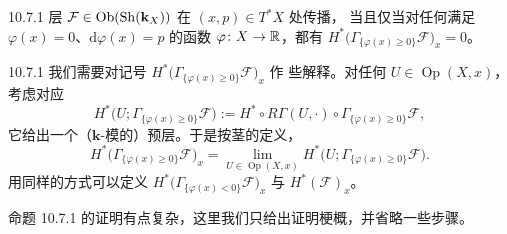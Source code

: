 \begin{wprop}{10.7.1}
  层 $\mathcal F\in\operatorname{Ob}(\operatorname{Sh}(\mathbf{k}_X))$ 在 $(x,p)\in T^*X$ 处传播，
  当且仅当对任何满足 $\varphi(x)=0$、$\mathrm d\varphi(x)=p$ 的函数
  $\varphi\colon X\to\mathbb{R}$，都有 $H^*\bigl(\Gamma_{\{\varphi(x)\ge0\}}\mathcal F
  \bigr)_x=0$。
\end{wprop}


\begin{wrem}{10.7.1}
  我们需要对记号 $H^*\bigl(\Gamma_{\{\varphi(x)\ge0\}}\mathcal F\bigr)_x$ 作
  些解释。对任何 $U\in\operatorname{Op}(X,x)$，考虑对应
  \[
    H^*\bigl(U;\Gamma_{\{\varphi(x)\ge0\}}\mathcal F\bigr)
    :=H^*\circ R\Gamma(U,\cdot)\circ\Gamma_{\{\varphi(x)\ge0\}}\mathcal F,
  \]
  它给出一个（$\mathbf{k}$-模的）预层。于是按茎的定义，
  \[
    H^*\bigl(\Gamma_{\{\varphi(x)\ge0\}}\mathcal F\bigr)_x
    =\lim_{U\in\operatorname{Op}(X,x)}H^*\bigl(U;
    \Gamma_{\{\varphi(x)\ge0\}}\mathcal F\bigr).
  \]
  用同样的方式可以定义
  $H^*\bigl(\Gamma_{\{\varphi(x)<0\}}\mathcal F\bigr)_x$ 与
  $H^*(\mathcal F)_x$。
\end{wrem}

命题 10.7.1 的证明有点复杂，这里我们只给出证明梗概，并省略一些步骤。

